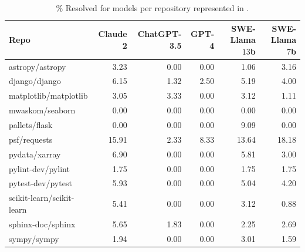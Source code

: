 \begin{table}[ht]
\begin{tabular}{lrrrrr}
    \toprule
    Repo & Claude 2 & ChatGPT-3.5 & GPT-4 & SWE-Llama $13$b & SWE-Llama $7$b \\
    \midrule
    astropy/astropy           & \num{3.23}  & \num{0.00} & \num{0.00} & \num{1.06 } & \num{3.16 } \\
    django/django             & \num{6.15}  & \num{1.32} & \num{2.50} & \num{5.19 } & \num{4.00 } \\
    matplotlib/matplotlib     & \num{3.05}  & \num{3.33} & \num{0.00} & \num{3.12 } & \num{1.11 } \\
    mwaskom/seaborn           & \num{0.00}  & \num{0.00} & \num{0.00} & \num{0.00 } & \num{0.00 } \\
    pallets/flask             & \num{0.00}  & \num{0.00} & \num{0.00} & \num{9.09 } & \num{0.00 } \\
    psf/requests              & \num{15.91} & \num{2.33} & \num{8.33} & \num{13.64} & \num{18.18} \\
    pydata/xarray             & \num{6.90}  & \num{0.00} & \num{0.00} & \num{5.81 } & \num{3.00 } \\
    pylint-dev/pylint         & \num{1.75}  & \num{0.00} & \num{0.00} & \num{1.75 } & \num{1.75 } \\
    pytest-dev/pytest         & \num{5.93}  & \num{0.00} & \num{0.00} & \num{5.04 } & \num{4.20 } \\
    scikit-learn/scikit-learn & \num{5.41}  & \num{0.00} & \num{0.00} & \num{3.12 } & \num{0.88 } \\
    sphinx-doc/sphinx         & \num{5.65}  & \num{1.83} & \num{0.00} & \num{2.25 } & \num{2.69 } \\
    sympy/sympy               & \num{1.94}  & \num{0.00} & \num{0.00} & \num{3.01 } & \num{1.59 } \\
    \bottomrule
\end{tabular}
\caption{\% Resolved for models per repository represented in \benchmark{}.}
\label{table:main-results-repo}
\end{table}